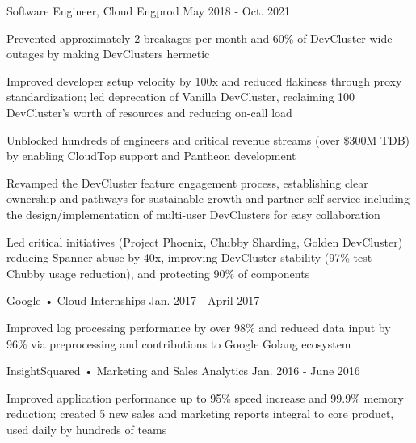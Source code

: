 \begin{cventries}
  \cventry
    {Software Engineer, Cloud Engprod} %
    {} %
    {} %
    {May 2018 - Oct. 2021} %
    {
      \begin{cvitems} %
        \item {Prevented approximately 2 breakages per month and 60\% of DevCluster-wide outages by making DevClusters hermetic}
        \item {Improved developer setup velocity by 100x and reduced flakiness through proxy standardization; led deprecation of Vanilla DevCluster, reclaiming 100 DevCluster's worth of resources and reducing on-call load}
        \item {Unblocked hundreds of engineers and critical revenue streams (over \$300M TDB) by enabling CloudTop support and Pantheon development}
        \item {Revamped the DevCluster feature engagement process, establishing clear ownership and pathways for sustainable growth and partner self-service including the design/implementation of multi-user DevClusters for easy collaboration}
        \item {Led critical initiatives (Project Phoenix, Chubby Sharding, Golden DevCluster) reducing Spanner abuse by 40x, improving DevCluster stability (97\% test Chubby usage reduction), and protecting 90\% of components}
      \end{cvitems}
    }

  \cventry
    {Google • Cloud} %
    {Internships} %
    {} %
    {Jan. 2017 - April 2017} %
    {
      \begin{cvitems} %
        \item {Improved log processing performance by over 98\% and reduced data input by 96\% via preprocessing and contributions to Google Golang ecosystem}
      \end{cvitems}
    }

  \cventry
    {InsightSquared • Marketing and Sales Analytics} %
    {} %
    {} %
    {Jan. 2016 - June 2016} %
    {
      \begin{cvitems} %
        \item {Improved application performance up to 95\% speed increase and 99.9\% memory reduction; created 5 new sales and marketing reports integral to core product, used daily by hundreds of teams}
      \end{cvitems}
    }


\end{cventries}
